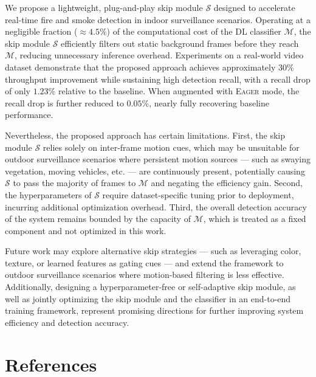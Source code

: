 \documentclass[
  10pt,
]{article}
\begin{document}
We propose a lightweight, plug-and-play skip module \(\mathcal{S}\)
designed to accelerate real-time fire and smoke detection in indoor
surveillance scenarios. Operating at a negligible fraction
(\({\approx}4.5\%\)) of the computational cost of the DL classifier
\(\mathcal{M}\), the skip module \(\mathcal{S}\) efficiently filters out
static background frames before they reach \(\mathcal{M}\), reducing
unnecessary inference overhead. Experiments on a real-world video
dataset demonstrate that the proposed approach achieves approximately
\(30\%\) throughput improvement while sustaining high detection recall,
with a recall drop of only \(1.23\%\) relative to the baseline. When
augmented with \textsc{Eager} mode, the recall drop is further reduced
to \(0.05\%\), nearly fully recovering baseline performance.

Nevertheless, the proposed approach has certain limitations. First, the
skip module \(\mathcal{S}\) relies solely on inter-frame motion cues,
which may be unsuitable for outdoor surveillance scenarios where
persistent motion sources --- such as swaying vegetation, moving
vehicles, etc. --- are continuously present, potentially causing
\(\mathcal{S}\) to pass the majority of frames to \(\mathcal{M}\) and
negating the efficiency gain. Second, the hyperparameters of
\(\mathcal{S}\) require dataset-specific tuning prior to deployment,
incurring additional optimization overhead. Third, the overall detection
accuracy of the system remains bounded by the capacity of
\(\mathcal{M}\), which is treated as a fixed component and not optimized
in this work.

Future work may explore alternative skip strategies --- such as
leveraging color, texture, or learned features as gating cues --- and
extend the framework to outdoor surveillance scenarios where
motion-based filtering is less effective. Additionally, designing a
hyperparameter-free or self-adaptive skip module, as well as jointly
optimizing the skip module and the classifier in an end-to-end training
framework, represent promising directions for further improving system
efficiency and detection accuracy.

\section*{References}\label{sec:references}
\end{document}
